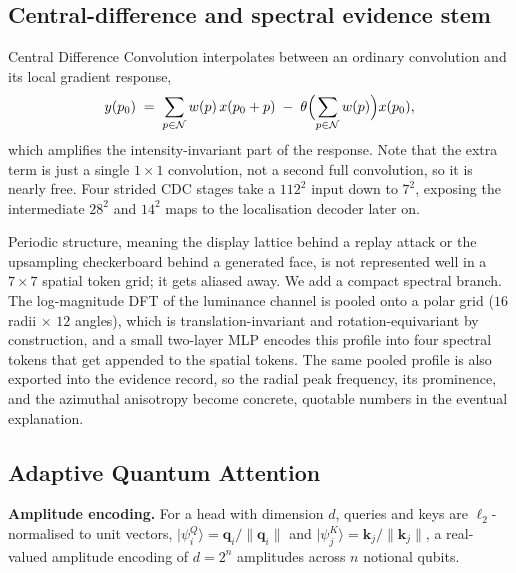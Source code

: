 \documentclass[conference]{IEEEtran}
\newcommand{\bs}[1]{\boldsymbol{#1}}
\newcommand{\ket}[1]{\lvert #1 \rangle}
\begin{document}
\subsection{Central-difference and spectral evidence stem}
Central Difference Convolution \cite{yu2020cdcn} interpolates between an ordinary
convolution and its local gradient response,
\begin{equation}
y(p_{0}) \;=\; \sum_{p\in\mathcal{N}} w(p)\,x(p_{0}+p)
\;-\;\theta \Bigl(\sum_{p\in\mathcal{N}} w(p)\Bigr) x(p_{0}),
\label{eq:cdc}
\end{equation}
which amplifies the intensity-invariant part of the response. Note that the extra
term is just a single $1\times1$ convolution, not a second full convolution, so it
is nearly free. Four strided CDC stages take a $112^{2}$ input down to $7^{2}$,
exposing the intermediate $28^{2}$ and $14^{2}$ maps to the localisation decoder
later on.

Periodic structure, meaning the display lattice behind a replay attack or the
upsampling checkerboard behind a generated face, is not represented well in a
$7\times7$ spatial token grid; it gets aliased away. We add a compact spectral
branch. The log-magnitude DFT of the luminance channel is pooled onto a polar grid
($16$ radii $\times$ $12$ angles), which is translation-invariant and
rotation-equivariant by construction, and a small two-layer MLP encodes this profile
into four spectral tokens that get appended to the spatial tokens. The same pooled
profile is also exported into the evidence record, so the radial peak frequency, its
prominence, and the azimuthal anisotropy become concrete, quotable numbers in the
eventual explanation.

\subsection{Adaptive Quantum Attention}
\textbf{Amplitude encoding.} For a head with dimension $d$, queries and keys are
$\ell_{2}$-normalised to unit vectors,
$\ket{\psi^{Q}_{i}} = \bs{q}_{i}/\lVert\bs{q}_{i}\rVert$ and
$\ket{\psi^{K}_{j}} = \bs{k}_{j}/\lVert\bs{k}_{j}\rVert$, a real-valued amplitude
encoding of $d=2^{n}$ amplitudes across $n$ notional qubits.
\end{document}
